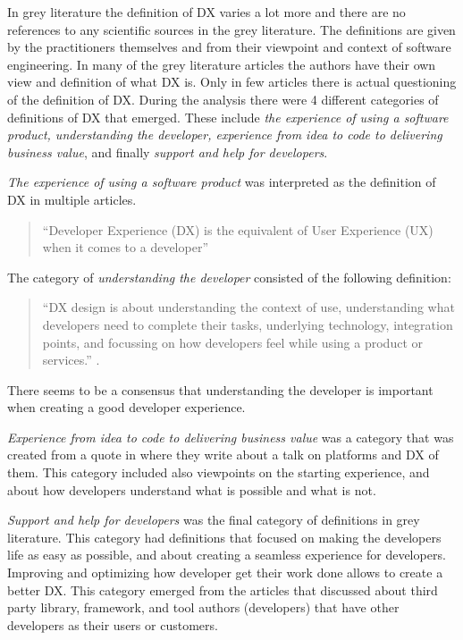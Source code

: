 \documentclass[english, 12pt, a4paper, sci, utf8, a-1b, online]{aaltothesis}
\begin{document}
In grey literature the definition of DX varies a lot more and there are no references to any scientific sources in the grey literature. The definitions are given by the practitioners themselves and from their viewpoint and context of software engineering. In many of the grey literature articles the authors have their own view and definition of what DX is. Only in few articles there is actual questioning of the definition of DX. During the analysis there were 4 different categories of definitions of DX that emerged. These include \textit{the experience of using a software product, understanding the developer, experience from idea to code to delivering business value}, and finally \textit{support and help for developers}.

\textit{The experience of using a software product} was interpreted as the definition of DX in multiple articles.

\begin{quote}
  ``Developer Experience (DX) is the equivalent of User Experience (UX) when it comes to a developer'' \parencite{the-best-practices-for-a-great-dx}
\end{quote}

\noindent The category of \textit{understanding the developer} consisted of the following definition:

\begin{quote}
  ``DX design is about understanding the context of use, understanding what developers need to complete their tasks, underlying technology, integration points, and focussing on how developers feel while using a product or services.'' \parencite{building-the-developer-experience-from-the-ground-up}.
\end{quote}

\noindent There seems to be a consensus that understanding the developer is important when creating a good developer experience.

\textit{Experience from idea to code to delivering business value} was a category that was created from a quote in \textcite{workflows-for-the-new-developer-experience} where they write about a talk on platforms and DX of them. This category included also viewpoints on the starting experience, and about how developers understand what is possible and what is not.

\textit{Support and help for developers} was the final category of definitions in grey literature. This category had definitions that focused on making the developers life as easy as possible, and about creating a seamless experience for developers. Improving and optimizing how developer get their work done allows to create a better DX. This category emerged from the articles that discussed about third party library, framework, and tool authors (developers) that have other developers as their users or customers.
\end{document}
